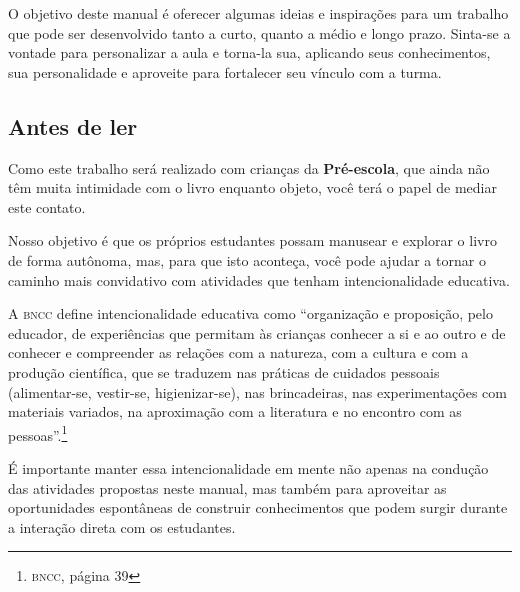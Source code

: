 \documentclass[11pt]{extarticle}
\begin{document}
O objetivo deste manual é oferecer algumas ideias 
e inspirações para um trabalho que pode ser desenvolvido tanto 
a curto, quanto a médio e longo prazo. Sinta-se a vontade para 
personalizar a aula e torna-la sua, aplicando seus conhecimentos, sua 
personalidade e aproveite para fortalecer 
seu vínculo com a turma.


\subsection{Antes de ler}


Como este trabalho será realizado com crianças da \textbf{Pré-escola}, 
que ainda não têm muita intimidade com o livro enquanto objeto, você terá o 
papel de mediar este contato. 

Nosso objetivo é que os próprios estudantes possam manusear 
e explorar o livro de forma autônoma, mas, para que isto aconteça, você 
pode ajudar a tornar o caminho mais convidativo com atividades que tenham 
intencionalidade educativa. 

A \textsc{bncc} define intencionalidade educativa como ``organização 
e proposição, pelo educador, de experiências que permitam às crianças 
conhecer a si e ao outro e de conhecer e compreender as relações com a 
natureza, com a cultura e com a produção científica, que se traduzem nas 
práticas de cuidados pessoais (alimentar-se, vestir-se, higienizar-se), 
nas brincadeiras, nas experimentações com materiais 
variados, na aproximação com a literatura e no encontro com as 
pessoas''.\footnote{\textsc{bncc}, página 39}

É importante manter essa intencionalidade em mente não apenas na condução 
das atividades propostas neste manual, mas também para aproveitar as 
oportunidades espontâneas de construir conhecimentos que podem surgir durante 
a interação direta com os estudantes.
\end{document}
